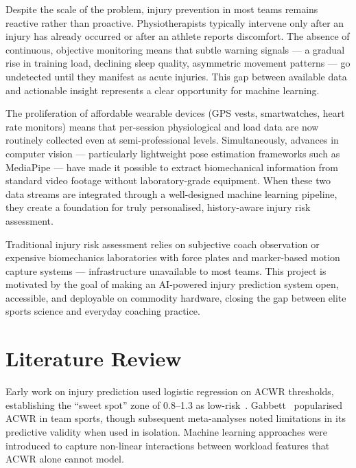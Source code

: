 \documentclass[12pt,a4paper]{report}
\begin{document}
\par
Despite the scale of the problem, injury prevention in most teams remains reactive rather than proactive. Physiotherapists typically intervene only after an injury has already occurred or after an athlete reports discomfort. The absence of continuous, objective monitoring means that subtle warning signals — a gradual rise in training load, declining sleep quality, asymmetric movement patterns — go undetected until they manifest as acute injuries. This gap between available data and actionable insight represents a clear opportunity for machine learning.

\par
The proliferation of affordable wearable devices (GPS vests, smartwatches, heart rate monitors) means that per-session physiological and load data are now routinely collected even at semi-professional levels. Simultaneously, advances in computer vision — particularly lightweight pose estimation frameworks such as MediaPipe — have made it possible to extract biomechanical information from standard video footage without laboratory-grade equipment. When these two data streams are integrated through a well-designed machine learning pipeline, they create a foundation for truly personalised, history-aware injury risk assessment.

\par
Traditional injury risk assessment relies on subjective coach observation or expensive biomechanics laboratories with force plates and marker-based motion capture systems — infrastructure unavailable to most teams. This project is motivated by the goal of making an AI-powered injury prediction system open, accessible, and deployable on commodity hardware, closing the gap between elite sports science and everyday coaching practice.

\clearpage

\chapter{Literature Review}

Early work on injury prediction used logistic regression on ACWR thresholds, establishing the ``sweet spot'' zone of 0.8--1.3 as low-risk~\cite{hulin2016}. Gabbett~\cite{gabbett2016} popularised ACWR in team sports, though subsequent meta-analyses noted limitations in its predictive validity when used in isolation. Machine learning approaches were introduced to capture non-linear interactions between workload features that ACWR alone cannot model.
\end{document}
